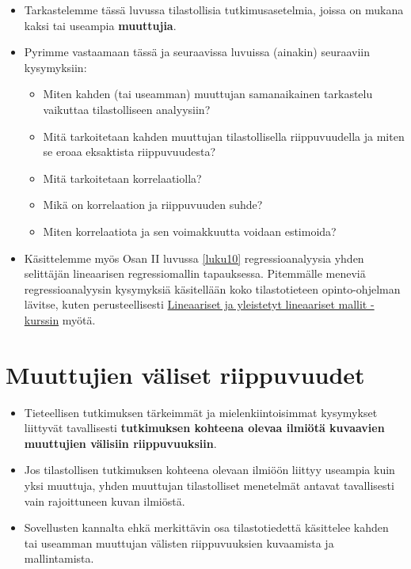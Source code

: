 \documentclass[
]{book}
\providecommand{\tightlist}{%
  \setlength{\itemsep}{0pt}\setlength{\parskip}{0pt}}
\begin{document}
\begin{itemize}
\item
  Tarkastelemme tässä luvussa tilastollisia tutkimusasetelmia, joissa on mukana kaksi tai useampia \textbf{muuttujia}.
\item
  Pyrimme vastaamaan tässä ja seuraavissa luvuissa (ainakin) seuraaviin kysymyksiin:

  \begin{itemize}
  \tightlist
  \item
    Miten kahden (tai useamman) muuttujan samanaikainen tarkastelu vaikuttaa tilastolliseen analyysiin?
  \item
    Mitä tarkoitetaan kahden muuttujan tilastollisella riippuvuudella ja miten se eroaa eksaktista riippuvuudesta?
  \item
    Mitä tarkoitetaan korrelaatiolla?
  \item
    Mikä on korrelaation ja riippuvuuden suhde?
  \item
    Miten korrelaatiota ja sen voimakkuutta voidaan estimoida?
  \end{itemize}
\item
  Käsittelemme myös Osan II luvussa \ref{luku10} regressioanalyysia yhden selittäjän lineaarisen regressiomallin tapauksessa. Pitemmälle meneviä regressioanalyysin kysymyksiä käsitellään koko tilastotieteen opinto-ohjelman lävitse, kuten perusteellisesti \href{https://opas.peppi.utu.fi/fi/opintojakso/TILM3588/5071?period=2024-2027}{Lineaariset ja yleistetyt lineaariset mallit -kurssin} myötä.
\end{itemize}

\hypertarget{alaluku61}{%
\section{Muuttujien väliset riippuvuudet}\label{alaluku61}}

\begin{itemize}
\item
  Tieteellisen tutkimuksen tärkeimmät ja mielenkiintoisimmat kysymykset liittyvät tavallisesti \textbf{tutkimuksen kohteena olevaa ilmiötä kuvaavien muuttujien välisiin riippuvuuksiin}.
\item
  Jos tilastollisen tutkimuksen kohteena olevaan ilmiöön liittyy useampia kuin yksi muuttuja, yhden muuttujan tilastolliset menetelmät antavat tavallisesti vain rajoittuneen kuvan ilmiöstä.
\item
  Sovellusten kannalta ehkä merkittävin osa tilastotiedettä käsittelee kahden tai useamman muuttujan välisten riippuvuuksien kuvaamista ja mallintamista.
\end{itemize}
\end{document}
